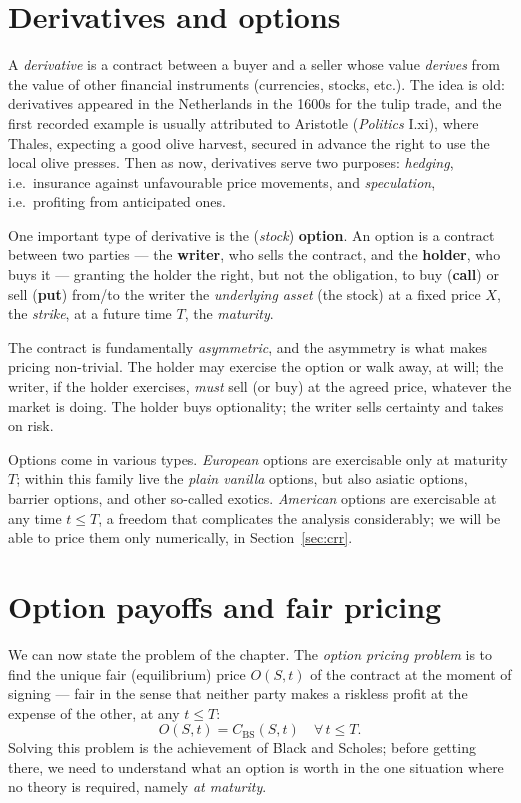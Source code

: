 \section{Derivatives and options}

A \emph{derivative} is a contract between a buyer and a seller whose value \emph{derives} from the value of other financial instruments (currencies, stocks, etc.).
The idea is old: derivatives appeared in the Netherlands in the 1600s for the tulip trade, and the first recorded example is usually attributed to Aristotle (\emph{Politics} I.xi), where Thales, expecting a good olive harvest, secured in advance the right to use the local olive presses.
Then as now, derivatives serve two purposes: \emph{hedging}, i.e.\ insurance against unfavourable price movements, and \emph{speculation}, i.e.\ profiting from anticipated ones.

One important type of derivative is the (\emph{stock}) \textbf{option}.
An option is a contract between two parties --- the \textbf{writer}, who sells the contract, and the \textbf{holder}, who buys it --- granting the holder the right, but not the obligation, to buy (\textbf{call}) or sell (\textbf{put}) from/to the writer the \emph{underlying asset} (the stock) at a fixed price $X$, the \emph{strike}, at a future time $T$, the \emph{maturity}.

The contract is fundamentally \emph{asymmetric}, and the asymmetry is what makes pricing non-trivial.
The holder may exercise the option or walk away, at will; the writer, if the holder exercises, \emph{must} sell (or buy) at the agreed price, whatever the market is doing.
The holder buys optionality; the writer sells certainty and takes on risk.

Options come in various types.
\emph{European} options are exercisable only at maturity $T$; within this family live the \emph{plain vanilla} options, but also asiatic options, barrier options, and other so-called exotics.
\emph{American} options are exercisable at any time $t\le T$, a freedom that complicates the analysis considerably; we will be able to price them only numerically, in Section~\ref{sec:crr}.


\section{Option payoffs and fair pricing}

We can now state the problem of the chapter.
The \emph{option pricing problem} is to find the unique fair (equilibrium) price $O(S,t)$ of the contract at the moment of signing --- fair in the sense that neither party makes a riskless profit at the expense of the other, at any $t\le T$:
\begin{equation}
O(S,t) = C_{\text{BS}}(S,t) \quad \forall\, t \le T.
\end{equation}
Solving this problem is the achievement of Black and Scholes; before getting there, we need to understand what an option is worth in the one situation where no theory is required, namely \emph{at maturity}.

